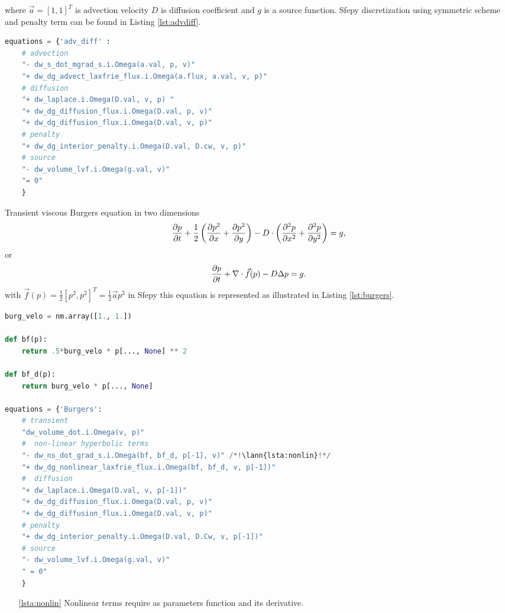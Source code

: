 where $\vec{a} = [1, 1]^T$ is advection velocity $D$ is diffusion coefficient and $g$ is 
a source function. Sfepy discretization using symmetric scheme and penalty term can be 
found in Listing 
\ref{lst:advdiff}.
\setcounter{lstannotation}{0}
\begin{lstlisting}[language=Python, caption=Static advection-diffusion equation
\label{lst:advdiff}]
equations = {'adv_diff' :
	# advection
	"- dw_s_dot_mgrad_s.i.Omega(a.val, p, v)"
	"+ dw_dg_advect_laxfrie_flux.i.Omega(a.flux, a.val, v, p)"
	# diffusion
	"+ dw_laplace.i.Omega(D.val, v, p) "
	"+ dw_dg_diffusion_flux.i.Omega(D.val, p, v)"
	"+ dw_dg_diffusion_flux.i.Omega(D.val, v, p)"
	# penalty
	"+ dw_dg_interior_penalty.i.Omega(D.val, D.cw, v, p)"
	# source
	"- dw_volume_lvf.i.Omega(g.val, v)"
	"= 0"
	}
\end{lstlisting}
Transient viscous Burgers equation in two dimensions
\begin{equation}
\label{eq:ex_burgers}
	\frac{\partial p}{\partial t} + \frac{1}{2}\left(\frac{\partial p^2}{\partial x} + \frac{\partial p^2}{\partial y}\right)  - 
	D \cdot \left( \frac{\partial^2 p}{\partial x^2} + \frac{\partial^2 p}{\partial y^2} \right) 
	= g,
\end{equation}
or
\begin{equation}
	\frac{\partial p}{\partial t} + \nabla \cdot \vec{f}(p) - D\Delta p = g.
\end{equation}
with $\vec{f}(p) = \frac{1}{2}[p^2, p^2]^T = \frac{1}{2}\vec{a} p^2$ in Sfepy this 
equation is represented as illustrated in Listing \ref{lst:burgers}.
\setcounter{lstannotation}{0}
\begin{lstlisting}[language=Python, caption=Viscous Burgers equation \label{lst:burgers}]
burg_velo = nm.array([1., 1.])

def bf(p):
	return .5*burg_velo * p[..., None] ** 2

def bf_d(p):
	return burg_velo * p[..., None]

equations = {'Burgers':
	# transient
	"dw_volume_dot.i.Omega(v, p)"
	#  non-linear hyperbolic terms
	"- dw_ns_dot_grad_s.i.Omega(bf, bf_d, p[-1], v)" /*!\lann{lsta:nonlin}!*/
	"+ dw_dg_nonlinear_laxfrie_flux.i.Omega(bf, bf_d, v, p[-1])"
	#  diffusion
	"+ dw_laplace.i.Omega(D.val, v, p[-1])"
	"+ dw_dg_diffusion_flux.i.Omega(D.val, p, v)"
	"+ dw_dg_diffusion_flux.i.Omega(D.val, v, p)"
	# penalty
	"+ dw_dg_interior_penalty.i.Omega(D.val, D.Cw, v, p[-1])"
	# source
	"- dw_volume_lvf.i.Omega(g.val, v)"
	" = 0"
	}
\end{lstlisting}
\begin{itemize}
	\item[\ref{lsta:nonlin}] Nonlinear terms require as parameters function and its 
	derivative.
\end{itemize}